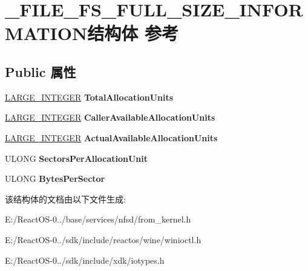 \hypertarget{struct___f_i_l_e___f_s___f_u_l_l___s_i_z_e___i_n_f_o_r_m_a_t_i_o_n}{}\section{\+\_\+\+F\+I\+L\+E\+\_\+\+F\+S\+\_\+\+F\+U\+L\+L\+\_\+\+S\+I\+Z\+E\+\_\+\+I\+N\+F\+O\+R\+M\+A\+T\+I\+O\+N结构体 参考}
\label{struct___f_i_l_e___f_s___f_u_l_l___s_i_z_e___i_n_f_o_r_m_a_t_i_o_n}
\subsection*{Public 属性}
\begin{DoxyCompactItemize}
\item 
\mbox{\label{struct___f_i_l_e___f_s___f_u_l_l___s_i_z_e___i_n_f_o_r_m_a_t_i_o_n_ac0d659a9a28be290cacb8580df54f423}} 
\hyperlink{union___l_a_r_g_e___i_n_t_e_g_e_r}{L\+A\+R\+G\+E\+\_\+\+I\+N\+T\+E\+G\+ER} {\bfseries Total\+Allocation\+Units}
\item 
\mbox{\label{struct___f_i_l_e___f_s___f_u_l_l___s_i_z_e___i_n_f_o_r_m_a_t_i_o_n_a6331b3a533ce795fea3347b35239441f}} 
\hyperlink{union___l_a_r_g_e___i_n_t_e_g_e_r}{L\+A\+R\+G\+E\+\_\+\+I\+N\+T\+E\+G\+ER} {\bfseries Caller\+Available\+Allocation\+Units}
\item 
\mbox{\label{struct___f_i_l_e___f_s___f_u_l_l___s_i_z_e___i_n_f_o_r_m_a_t_i_o_n_a0a6e0f22b73dd5f836af14c304dde77f}} 
\hyperlink{union___l_a_r_g_e___i_n_t_e_g_e_r}{L\+A\+R\+G\+E\+\_\+\+I\+N\+T\+E\+G\+ER} {\bfseries Actual\+Available\+Allocation\+Units}
\item 
\mbox{\label{struct___f_i_l_e___f_s___f_u_l_l___s_i_z_e___i_n_f_o_r_m_a_t_i_o_n_ae4beecc4d1f51e041bf4a5c630b5df44}} 
U\+L\+O\+NG {\bfseries Sectors\+Per\+Allocation\+Unit}
\item 
\mbox{\label{struct___f_i_l_e___f_s___f_u_l_l___s_i_z_e___i_n_f_o_r_m_a_t_i_o_n_a4dfd62bd36d54e0f7493d44cfb611143}} 
U\+L\+O\+NG {\bfseries Bytes\+Per\+Sector}
\end{DoxyCompactItemize}


该结构体的文档由以下文件生成\+:\begin{DoxyCompactItemize}
\item 
E\+:/\+React\+O\+S-\/0../base/services/nfsd/from\+\_\+kernel.\+h\item 
E\+:/\+React\+O\+S-\/0../sdk/include/reactos/wine/winioctl.\+h\item 
E\+:/\+React\+O\+S-\/0../sdk/include/xdk/iotypes.\+h\end{DoxyCompactItemize}
